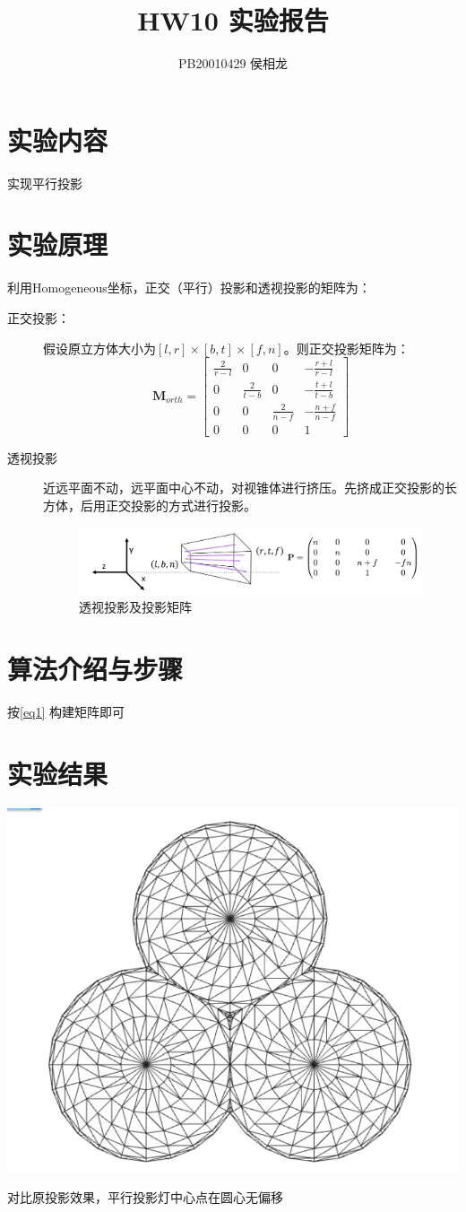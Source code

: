 \documentclass{article}
\title{HW10 实验报告}
\author{PB20010429 侯相龙}
\begin{document}
\maketitle
\section{实验内容}
实现平行投影


\section{实验原理}
利用Homogeneous坐标，正交（平行）投影和透视投影的矩阵为：
\begin{description}
    \item[正交投影：] 假设原立方体大小为$[l,r]\times[b,t]\times[f,n]$。则正交投影矩阵为：
    \begin{equation}\label{eq1}
        \mathbf{M}_{orth}=\begin{bmatrix}\frac{2}{r-l}&0&0&-\frac{r+l}{r-l}\\ 0&\frac{2}{t-b}&0&-\frac{t+l}{t-b}\\ 0&0&\frac{2}{n-f}&-\frac{n+f}{n-f}\\ 0&0&0&1\end{bmatrix}
    \end{equation}
    \item [透视投影]近远平面不动，远平面中心不动，对视锥体进行挤压。先挤成正交投影的长方体，后用正交投影的方式进行投影。
    \begin{figure}[h]
        \begin{center}
            \includegraphics[width=0.7\linewidth]{2.png}
        \end{center}
        \caption{透视投影及投影矩阵}
    \end{figure}
\end{description}

\section{算法介绍与步骤}
按\ref{eq1} 构建矩阵即可


\section{实验结果}

\includegraphics[width=0.7\linewidth]{1.png}

对比原投影效果，平行投影灯中心点在圆心无偏移
\end{document}
